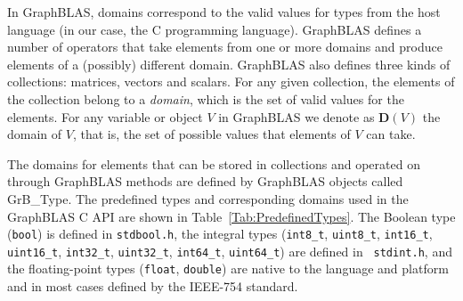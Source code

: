 In GraphBLAS, domains correspond to the valid values for types from the
host language (in our case, the C programming language).  GraphBLAS defines
a number of operators that take elements from one or more domains and produce elements of a (possibly) different domain.  GraphBLAS also defines 
three kinds of collections: matrices, vectors and scalars.  For any given 
collection, the elements of the collection belong to a \emph{domain}, which 
is the set of valid values for the elements.  For any variable 
or object $V$ in GraphBLAS we denote as $\mathbf{D}(V)$ the domain of $V$,
that is, the set of possible values that elements of $V$ can take.  

The domains for elements that can be stored in collections and operated on
through GraphBLAS methods are defined by GraphBLAS objects called {\sf GrB\_Type}.
The predefined types and corresponding domains used in the GraphBLAS C API are
shown in Table~\ref{Tab:PredefinedTypes}.  The Boolean type ({\tt bool})
is defined in {\tt stdbool.h}, the integral types ({\tt int8\_t},
{\tt uint8\_t}, {\tt int16\_t}, {\tt uint16\_t}, {\tt int32\_t},
{\tt uint32\_t}, {\tt int64\_t}, {\tt uint64\_t}) are defined in {\tt
stdint.h}, and the floating-point types ({\tt float}, {\tt double}) are
native to the language and platform and in most cases defined by the 
IEEE-754 standard.

